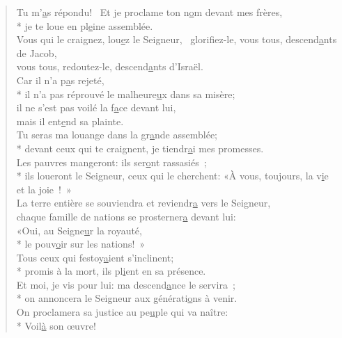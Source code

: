 \begin{verse}
Tu m’\underline{a}s répondu!~\psalmdagger
{}Et je proclame ton n\underline{o}m devant mes frères, \\*
je te loue en pl\underline{e}ine assemblée. \\

Vous qui le craignez, lou\underline{e}z le Seigneur,~\psalmdagger
glorifiez-le, vous tous, descend\underline{a}nts de Jacob, \\
vous tous, redoutez-le, descend\underline{a}nts d’Israël. \\

Car il n’a p\underline{a}s rejeté, \\*
il n’a pas réprouvé le malheure\underline{u}x dans sa misère; \\
il ne s’est pas voilé la f\underline{a}ce devant lui, \\
mais il ent\underline{e}nd sa plainte. \\

Tu seras ma louange dans la gr\underline{a}nde assemblée; \\*
devant ceux qui te craignent, je tiendr\underline{a}i mes promesses. \\
Les pauvres mangeront: ils ser\underline{o}nt rassasiés ; \\*
ils loueront le Seigneur, ceux qui le cherchent:
«À vous, toujours, la v\underline{i}e et la joie ! » \\

La terre entière se souviendra
et reviendr\underline{a} vers le Seigneur, \\
chaque famille de nations se prosterner\underline{a} devant lui: \\
«Oui, au Seigne\underline{u}r la royauté, \\*
le pouv\underline{o}ir sur les nations! » \\

Tous ceux qui festoy\underline{a}ient s’inclinent; \\*
promis à la mort, ils pl\underline{i}ent en sa présence. \\

Et moi, je vis pour lui: ma descend\underline{a}nce le servira ; \\*
on annoncera le Seigneur aux générati\underline{o}ns à venir. \\
On proclamera sa justice au pe\underline{u}ple qui va naître: \\*
Voil\underline{à} son œuvre! \\
\end{verse}

